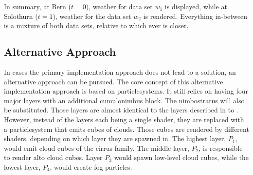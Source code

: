 \noindent
In summary,  at Bern ($t = 0$), weather for data set $w_1$ is displayed, while at Solothurn ($t = 1$), weather for the data set $w_2$ is rendered.
Everything in-between is a mixture of both data sets, relative to which ever is closer.

\pagebreak

\subsection{Alternative Approach}
\label{section:impl:altapproach}
In cases the primary implementation approach does not lead to a solution, an alternative approach can be pursued.
\emptyline
The core concept of this alternative implementation approach is based on \gls{particlesystem}s.
It still relies on having four major layers with an additional cumulonimbus block. The nimbostratus will also be substituted.
Those layers are almost identical to the layers described in  to .
\\
However, instead of the layers each being a single \gls{shader}, they are replaced with a \gls{particlesystem} that emits cubes of clouds.
Those cubes are rendered by different \gls{shader}s, depending on which layer they are spawned in.
The highest layer, \color{darkercyan}$P_1$\color{black}, would emit cloud cubes of the cirrus family.
The middle layer, \color{darkercyan}$P_2$\color{black}, is responsible to render alto cloud cubes.
Layer \color{darkercyan}$P_3$ \color{black} would spawn low-level cloud cubes, while the lowest layer, \color{darkercyan}$P_4$\color{black}, would create fog particles.

